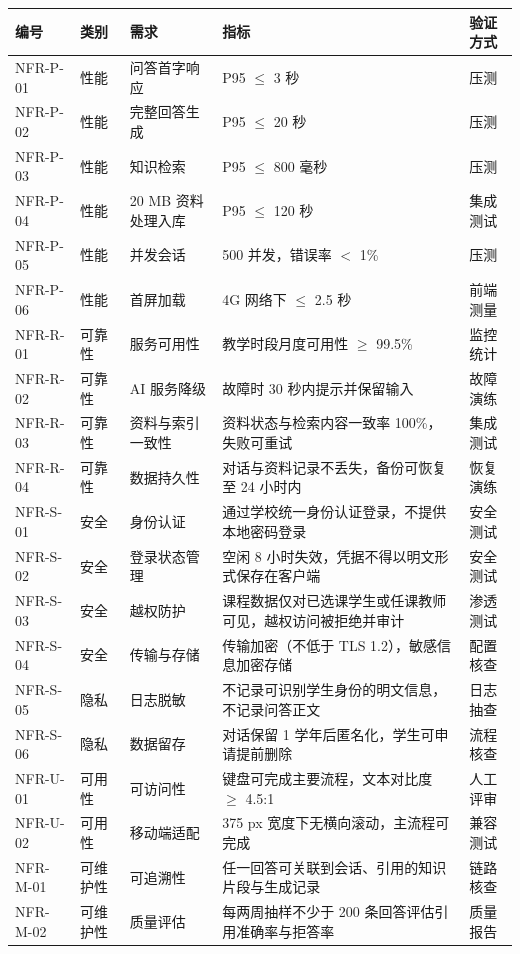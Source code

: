 \documentclass[12pt,a4paper]{ctexart}
\begin{document}
\begin{longtable}{@{}L{2.0cm}L{2.4cm}L{5.2cm}L{3.0cm}L{2.0cm}@{}}
  \toprule
  \textbf{编号} & \textbf{类别} & \textbf{需求} & \textbf{指标} & \textbf{验证方式} \\
  \midrule
  \endhead
  NFR-P-01 & 性能 & 问答首字响应 & P95 $\leq$ 3 秒 & 压测 \\
  NFR-P-02 & 性能 & 完整回答生成 & P95 $\leq$ 20 秒 & 压测 \\
  NFR-P-03 & 性能 & 知识检索 & P95 $\leq$ 800 毫秒 & 压测 \\
  NFR-P-04 & 性能 & 20 MB 资料处理入库 & P95 $\leq$ 120 秒 & 集成测试 \\
  NFR-P-05 & 性能 & 并发会话 & 500 并发，错误率 $<$ 1\% & 压测 \\
  NFR-P-06 & 性能 & 首屏加载 & 4G 网络下 $\leq$ 2.5 秒 & 前端测量 \\
  NFR-R-01 & 可靠性 & 服务可用性 & 教学时段月度可用性 $\geq$ 99.5\% & 监控统计 \\
  NFR-R-02 & 可靠性 & AI 服务降级 & 故障时 30 秒内提示并保留输入 & 故障演练 \\
  NFR-R-03 & 可靠性 & 资料与索引一致性 & 资料状态与检索内容一致率 100\%，失败可重试 & 集成测试 \\
  NFR-R-04 & 可靠性 & 数据持久性 & 对话与资料记录不丢失，备份可恢复至 24 小时内 & 恢复演练 \\
  NFR-S-01 & 安全 & 身份认证 & 通过学校统一身份认证登录，不提供本地密码登录 & 安全测试 \\
  NFR-S-02 & 安全 & 登录状态管理 & 空闲 8 小时失效，凭据不得以明文形式保存在客户端 & 安全测试 \\
  NFR-S-03 & 安全 & 越权防护 & 课程数据仅对已选课学生或任课教师可见，越权访问被拒绝并审计 & 渗透测试 \\
  NFR-S-04 & 安全 & 传输与存储 & 传输加密（不低于 TLS 1.2），敏感信息加密存储 & 配置核查 \\
  NFR-S-05 & 隐私 & 日志脱敏 & 不记录可识别学生身份的明文信息，不记录问答正文 & 日志抽查 \\
  NFR-S-06 & 隐私 & 数据留存 & 对话保留 1 学年后匿名化，学生可申请提前删除 & 流程核查 \\
  NFR-U-01 & 可用性 & 可访问性 & 键盘可完成主要流程，文本对比度 $\geq$ 4.5:1 & 人工评审 \\
  NFR-U-02 & 可用性 & 移动端适配 & 375 px 宽度下无横向滚动，主流程可完成 & 兼容测试 \\
  NFR-M-01 & 可维护性 & 可追溯性 & 任一回答可关联到会话、引用的知识片段与生成记录 & 链路核查 \\
  NFR-M-02 & 可维护性 & 质量评估 & 每两周抽样不少于 200 条回答评估引用准确率与拒答率 & 质量报告 \\
  \bottomrule
\end{longtable}
\end{document}
